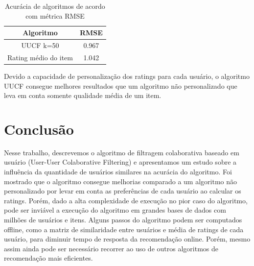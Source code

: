 \documentclass[12pt, a4paper, oneside]{article}
\begin{document}
\begin{table}[!ht]
\centering
\begin{tabular}{|c|c|}
\hline
\textbf{Algoritmo}   & \textbf{RMSE} \\ \hline
UUCF k=50            & 0.967 \\ \hline
Rating médio do item & 1.042 \\ \hline
\end{tabular}
\caption{Acurácia de algoritmos de acordo com métrica RMSE}
\label{tab:rmse}
\end{table}


Devido a capacidade de personalização dos ratings para cada usuário, o algoritmo UUCF consegue melhores resultados que um algoritmo não personalizado que leva em conta somente qualidade média de um item.

\section{Conclusão}
\label{sec:conclusao}
Nesse trabalho, descrevemos o algoritmo de filtragem colaborativa baseado em usuário (User-User Colaborative Filtering) e apresentamos um estudo sobre a influência da quantidade de usuários similares na acurácia do algoritmo. Foi mostrado que o algoritmo consegue melhorias comparado a um algoritmo não personalizado por levar em conta as preferências de cada usuário ao calcular os ratings. Porém, dado a alta complexidade de execução no pior caso do algoritmo, pode ser inviável a execução do algoritmo em grandes bases de dados com milhões de usuários e itens. Alguns passos do algoritmo podem ser computados offline, como a matriz de similaridade entre usuários e média de ratings de cada usuário, para diminuir tempo de resposta da recomendação online. Porém, mesmo assim ainda pode ser necessário recorrer ao uso de outros algoritmos de recomendação mais eficientes.



\end{document}
